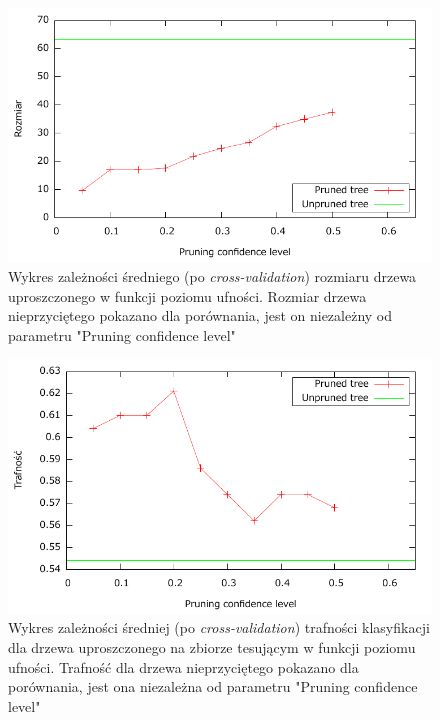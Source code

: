 \begin{itemize}
\begin{figure}	
	\includegraphics[scale=0.7]{figures/part1/task5a/rozmiar.pdf}
	\caption{Wykres zależności średniego (po \emph{cross-validation}) rozmiaru drzewa uproszczonego w funkcji poziomu ufności. Rozmiar drzewa nieprzyciętego pokazano dla porównania, jest on niezależny od parametru "Pruning confidence level"}
	\label{p1t5a-rozmiar}
\end{figure}

\begin{figure}	
	\includegraphics[scale=0.7]{figures/part1/task5a/trafnosc.pdf}
	\caption{Wykres zależności średniej (po \emph{cross-validation}) trafności klasyfikacji dla drzewa uproszczonego na zbiorze tesującym w funkcji poziomu ufności. Trafność dla drzewa nieprzyciętego pokazano dla porównania, jest ona niezależna od parametru "Pruning confidence level" }
	\label{p1t5a-trafnosc}
\end{figure}


\end{itemize}
